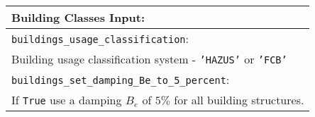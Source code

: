 \documentclass[a4paper, 12pt]{report}
\begin{document}
\vspace{2em}
\begin{tabular}{|p{\textwidth}|}
\hline
\vspace{0.3em} \noindent \Large \textbf{Building Classes Input:} \normalsize \\
\hline \vspace{0.1em} \texttt{buildings\_usage\_classification}: \\
Building usage classification system - \texttt{'HAZUS'} or \texttt{'FCB'} \\
\hline \vspace{0.1em}
\texttt{buildings\_set\_damping\_Be\_to\_5\_percent}: \\
If \texttt{True} use a damping $B_e$ of $5\%$ for all building structures.\\
\hline
 \end{tabular}
\end{document}
